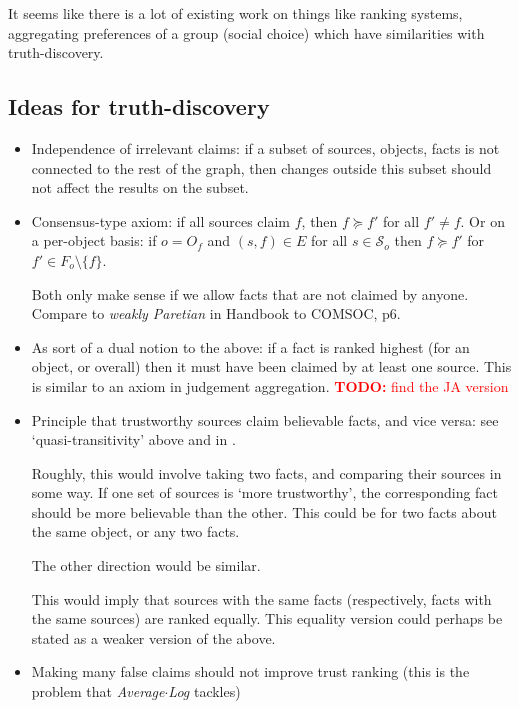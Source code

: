 \documentclass{article}
\theoremstyle{definition} \newtheorem{definition}{Definition}
\theoremstyle{definition} \newtheorem{example}{Example}
\theoremstyle{plain} \newtheorem{axiom}{Axiom}
\theoremstyle{plain} \newtheorem*{remark}{Remark}
\theoremstyle{remark} \newtheorem*{notation}{Notation}
\theoremstyle{plain} \newtheorem{lemma}{Lemma}
\theoremstyle{plain} \newtheorem{theorem}{Theorem}
\theoremstyle{plain} \newtheorem{proposition}{Proposition}
\newcommand{\todo}[1] {
    \textcolor{red}{
        \textbf{TODO:} #1
    }
}
\renewcommand{\S}{\mathcal{S}}  %
\newcommand{\fge}{\succeq}
\begin{document}
It seems like there is a lot of existing work on things like ranking systems,
aggregating preferences of a group (social choice) which have similarities with
truth-discovery.

\subsection{Ideas for truth-discovery}
\begin{itemize}

\item Independence of irrelevant claims: if a subset of sources, objects, facts
is not connected to the rest of the graph, then changes outside this subset
should not affect the results on the subset.

\item Consensus-type axiom: if all sources claim $f$, then $f \fge f'$ for all
$f' \ne f$. Or on a per-object basis: if $o = O_f$ and $(s, f) \in E$ for all
$s \in \S_o$ then $f \fge f'$ for $f' \in F_o \setminus \{f\}$.

Both only make sense if we allow facts that are not claimed by anyone. Compare
to \emph{weakly Paretian} in Handbook to COMSOC, p6.

\item As sort of a dual notion to the above: if a fact is ranked highest (for
an object, or overall) then it must have been claimed by at least one source.
This is similar to an axiom in judgement aggregation. \todo{find the JA
version}

\item Principle that trustworthy sources claim believable facts, and vice
versa: see `quasi-transitivity' above and in \cite{altman_personalised}.

Roughly, this would involve taking two facts, and comparing their sources in
some way. If one set of sources is `more trustworthy', the corresponding fact
should be more believable than the other. This could be for two facts about the
same object, or any two facts.

The other direction would be similar.

This would imply that sources with the same facts (respectively, facts with the
same sources) are ranked equally. This equality version could perhaps be
stated as a weaker version of the above.

\item Making many false claims should not improve trust ranking (this is the
problem that \emph{Average${\cdot}$Log} tackles)


\end{itemize}
\end{document}
